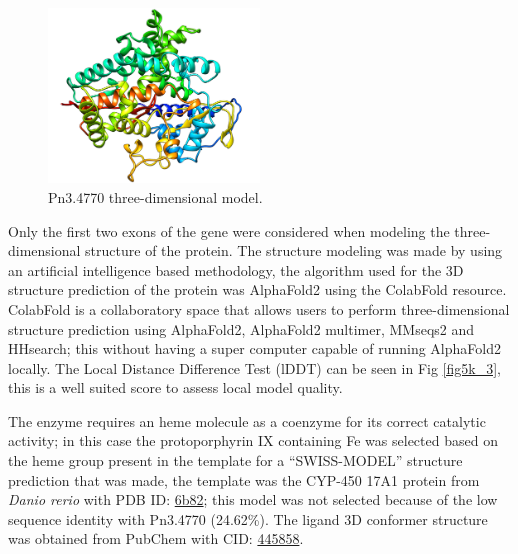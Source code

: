 \documentclass[12pt]{article}
\begin{document}
	\FloatBarrier
	\begin{figure}
		\centering
		\includegraphics[width=0.5\textwidth]{../5/known/Minimize/model2.png}
		\caption{Pn3.4770 three-dimensional model.}
		\label{fig5k_2}
	\end{figure}
	\FloatBarrier
	
	Only the first two exons of the gene were considered when modeling the three-dimensional structure of the protein. The structure modeling was made by using an artificial intelligence based methodology, the algorithm used for the 3D structure prediction of the protein was AlphaFold2 using the ColabFold resource. \cite{alphafold,colabfold} ColabFold is a collaboratory space that allows users to perform three-dimensional structure prediction using AlphaFold2, AlphaFold2 multimer, MMseqs2 and HHsearch; this without having a super computer capable of running AlphaFold2 locally. The Local Distance Difference Test (lDDT) can be seen in Fig \ref{fig5k_3}, this is a well suited score to assess local model quality. \cite{lddt}
	
	The enzyme requires an heme molecule as a coenzyme for its correct catalytic activity; in this case the protoporphyrin IX containing Fe was selected based on the heme group present in the template for a ``SWISS-MODEL'' structure prediction that was made, the template was the CYP-450 17A1 protein from \textit{Danio rerio} with PDB ID: \href{https://www.rcsb.org/structure/6b82}{6b82}; this model was not selected because of the low sequence identity with Pn3.4770 (24.62\%). The ligand 3D conformer structure was obtained from PubChem with CID: \href{https://pubchem.ncbi.nlm.nih.gov/compound/445858}{445858}.
	
\end{document}

